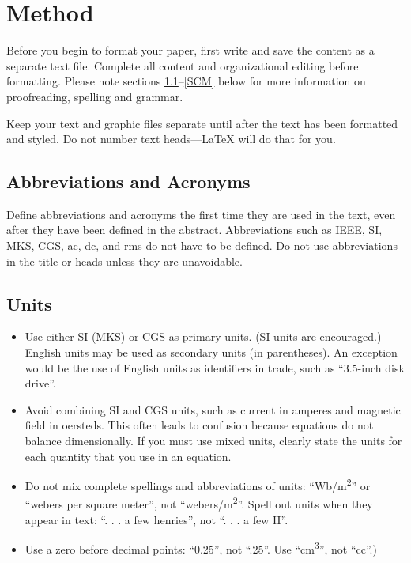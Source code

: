 \documentclass[conference]{IEEEtran}
\begin{document}
\section{Method}
Before you begin to format your paper, first write and save the content as a 
separate text file. Complete all content and organizational editing before 
formatting. Please note sections \ref{AA}--\ref{SCM} below for more information on 
proofreading, spelling and grammar.

Keep your text and graphic files separate until after the text has been 
formatted and styled. Do not number text heads---{\LaTeX} will do that 
for you.

\subsection{Abbreviations and Acronyms}\label{AA}
Define abbreviations and acronyms the first time they are used in the text, 
even after they have been defined in the abstract. Abbreviations such as 
IEEE, SI, MKS, CGS, ac, dc, and rms do not have to be defined. Do not use 
abbreviations in the title or heads unless they are unavoidable.

\subsection{Units}
\begin{itemize}
\item Use either SI (MKS) or CGS as primary units. (SI units are encouraged.) English units may be used as secondary units (in parentheses). An exception would be the use of English units as identifiers in trade, such as ``3.5-inch disk drive''.
\item Avoid combining SI and CGS units, such as current in amperes and magnetic field in oersteds. This often leads to confusion because equations do not balance dimensionally. If you must use mixed units, clearly state the units for each quantity that you use in an equation.
\item Do not mix complete spellings and abbreviations of units: ``Wb/m\textsuperscript{2}'' or ``webers per square meter'', not ``webers/m\textsuperscript{2}''. Spell out units when they appear in text: ``. . . a few henries'', not ``. . . a few H''.
\item Use a zero before decimal points: ``0.25'', not ``.25''. Use ``cm\textsuperscript{3}'', not ``cc''.)
\end{itemize}
\end{document}
